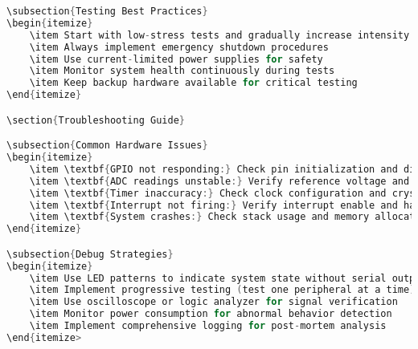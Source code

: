 \documentclass[11pt,a4paper]{article}
\begin{document}
\begin{lstlisting}[language=C]
\subsection{Testing Best Practices}
\begin{itemize}
    \item Start with low-stress tests and gradually increase intensity
    \item Always implement emergency shutdown procedures
    \item Use current-limited power supplies for safety
    \item Monitor system health continuously during tests
    \item Keep backup hardware available for critical testing
\end{itemize}

\section{Troubleshooting Guide}

\subsection{Common Hardware Issues}
\begin{itemize}
    \item \textbf{GPIO not responding:} Check pin initialization and direction
    \item \textbf{ADC readings unstable:} Verify reference voltage and grounding
    \item \textbf{Timer inaccuracy:} Check clock configuration and crystal accuracy
    \item \textbf{Interrupt not firing:} Verify interrupt enable and handler registration
    \item \textbf{System crashes:} Check stack usage and memory allocation
\end{itemize}

\subsection{Debug Strategies}
\begin{itemize}
    \item Use LED patterns to indicate system state without serial output
    \item Implement progressive testing (test one peripheral at a time)
    \item Use oscilloscope or logic analyzer for signal verification
    \item Monitor power consumption for abnormal behavior detection
    \item Implement comprehensive logging for post-mortem analysis
\end{itemize>


\end{lstlisting}
\end{document}

